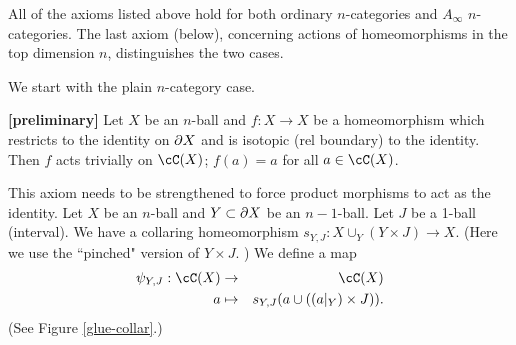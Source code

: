 \medskip

All of the axioms listed above hold for both ordinary $n$-categories and $A_\infty$ $n$-categories.
The last axiom (below), concerning actions of 
homeomorphisms in the top dimension $n$, distinguishes the two cases.

We start with the plain $n$-category case.

\begin{axiom}{\textup{\textbf{[preliminary]}}}
Let $X$ be an $n$-ball and $f: X\to X$ be a homeomorphism which restricts
to the identity on $\partial X$ and is isotopic (rel boundary) to the identity.
Then $f$ acts trivially on $\cC(X)$; $f(a) = a$ for all $a\in \cC(X)$.
\end{axiom}

This axiom needs to be strengthened to force product morphisms to act as the identity.
Let $X$ be an $n$-ball and $Y\subset\partial X$ be an $n{-}1$-ball.
Let $J$ be a 1-ball (interval).
We have a collaring homeomorphism $s_{Y,J}: X\cup_Y (Y\times J) \to X$.
(Here we use the ``pinched" version of $Y\times J$.
)
We define a map
\begin{eqnarray*}
	\psi_{Y,J}: \cC(X) &\to& \cC(X) \\
	a & \mapsto & s_{Y,J}(a \cup ((a|_Y)\times J)) .
\end{eqnarray*}
(See Figure \ref{glue-collar}.)
